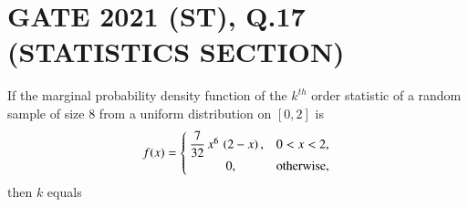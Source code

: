 \documentclass[journal,12pt,twocolumn]{IEEEtran}
\begin{document}
\section{GATE 2021 (ST), Q.17 (STATISTICS SECTION)} 
If the marginal probability density function of the $k^{th}$ order statistic of a 
random sample of size 8 from a uniform distribution on $[0,2]$ is
\begin{align}
  f(x) =
  \begin{cases}
   \dfrac{7}{32}\,x^{6}\,\left(2-x\right),  & 0<x<2, \\ 
      \hspace{1cm}   0,               & \text{otherwise,} 
  \end{cases}
\label{qnpdf}
\end{align}
then $k$ equals \underline{\hspace{3cm}}
\vspace{0.2cm}
\end{document}
